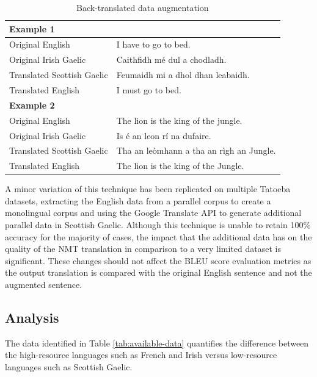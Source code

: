 \begin{table}[!ht]
\centering
\renewcommand{\arraystretch}{1.1}
\begin{tabular}{|l|l|}
\hline
\multicolumn{2}{|l|}{\textbf{Example 1}}                              \\ \hline
Original English           & I have to go to bed.                     \\ \hline
Original Irish Gaelic      & Caithfidh mé dul a chodladh.             \\ \hline
Translated Scottish Gaelic & Feumaidh mi a dhol dhan leabaidh.        \\ \hline
Translated English         & I must go to bed.                        \\ \hline
\multicolumn{2}{|l|}{\textbf{Example 2}}                              \\ \hline
Original English           & The lion is the king of the jungle.      \\ \hline
Original Irish Gaelic      & Is é an leon rí na dufaire.              \\ \hline
Translated Scottish Gaelic & Tha an leòmhann a tha an rìgh an Jungle. \\ \hline
Translated English         & The lion is the king of the Jungle.      \\ \hline
\end{tabular}
\captionsetup{justification=centering}
\caption{Back-translated data augmentation}
\label{tab:back_translated-data}
\end{table}

A minor variation of this technique has been replicated on multiple Tatoeba datasets, extracting the English data from a parallel corpus to create a monolingual corpus and using the Google Translate API to generate additional parallel data in Scottish Gaelic. Although this technique is unable to retain 100\% accuracy for the majority of cases, the impact that the additional data has on the quality of the \acrshort{NMT} translation in comparison to a very limited dataset is significant. These changes should not affect the BLEU score evaluation metrics as the output translation is compared with the original English sentence and not the augmented sentence.


\subsection{Analysis}

The data identified in Table \ref{tab:available-data} quantifies the difference between the high-resource languages such as French and Irish versus low-resource languages such as Scottish Gaelic. 

